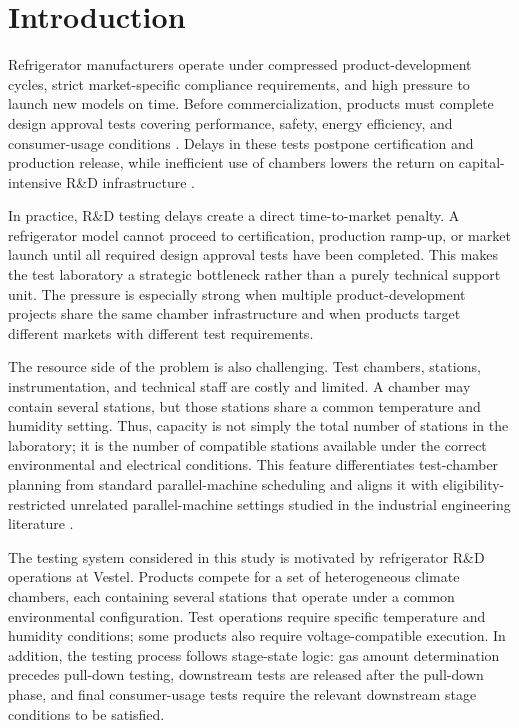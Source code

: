 \documentclass[11pt]{article}
\begin{document}
\section{Introduction}
\label{sec:intro}

Refrigerator manufacturers operate under compressed product-development cycles, strict market-specific compliance requirements, and high pressure to launch new models on time. Before commercialization, products must complete design approval tests covering performance, safety, energy efficiency, and consumer-usage conditions \citep{IEA2021,IEC60335-1,IEC60335-2-24,IEC62552}. Delays in these tests postpone certification and production release, while inefficient use of chambers lowers the return on capital-intensive R\&D infrastructure \citep{OECD_MSTI2024,OECD_MSTI2025}.

In practice, R\&D testing delays create a direct time-to-market penalty. A refrigerator model cannot proceed to certification, production ramp-up, or market launch until all required design approval tests have been completed. This makes the test laboratory a strategic bottleneck rather than a purely technical support unit. The pressure is especially strong when multiple product-development projects share the same chamber infrastructure and when products target different markets with different test requirements.

The resource side of the problem is also challenging. Test chambers, stations, instrumentation, and technical staff are costly and limited. A chamber may contain several stations, but those stations share a common temperature and humidity setting. Thus, capacity is not simply the total number of stations in the laboratory; it is the number of compatible stations available under the correct environmental and electrical conditions. This feature differentiates test-chamber planning from standard parallel-machine scheduling and aligns it with eligibility-restricted unrelated parallel-machine settings studied in the industrial engineering literature \citep{AfzaliradRezaeian2016}.

The testing system considered in this study is motivated by refrigerator R\&D operations at Vestel. Products compete for a set of heterogeneous climate chambers, each containing several stations that operate under a common environmental configuration. Test operations require specific temperature and humidity conditions; some products also require voltage-compatible execution. In addition, the testing process follows stage-state logic: gas amount determination precedes pull-down testing, downstream tests are released after the pull-down phase, and final consumer-usage tests require the relevant downstream stage conditions to be satisfied.
\end{document}
